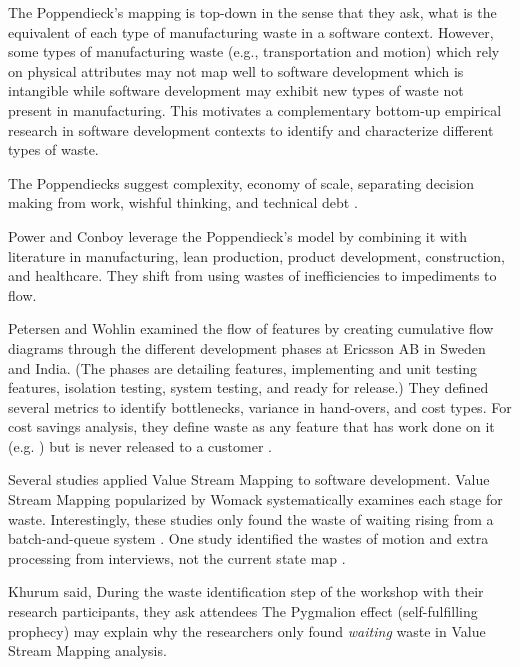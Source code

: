 The Poppendieck's mapping is top-down in the sense that they ask, what is the equivalent of each type of manufacturing waste in a software context. However, some types of manufacturing waste (e.g., transportation and motion) which rely on physical attributes may not map well to software development which is intangible while software development may exhibit new types of waste not present in manufacturing. This motivates a complementary bottom-up empirical research in software development contexts to identify and characterize different types of waste. 


The Poppendiecks suggest  complexity, economy of scale, separating decision making from work, wishful thinking, and technical debt \cite{PoppendieckResultsNotPoint}.


Power and Conboy leverage the Poppendieck's model by combining it with literature in manufacturing, lean production, product development, construction, and healthcare. They shift from using wastes of inefficiencies to impediments to flow. \cite{PowerImpediments}


Petersen and Wohlin examined the flow of features by creating cumulative flow diagrams through the different development phases at Ericsson AB in Sweden and India. (The phases are detailing features, implementing and unit testing features, isolation testing, system testing, and ready for release.) They defined several metrics to identify bottlenecks, variance in hand-overs, and cost types. For cost savings analysis, they define waste as any feature that has work done on it (e.g. ) but is never released to a customer \cite{Petersen2011}.


Several studies applied Value Stream Mapping to software development. Value Stream Mapping popularized by Womack systematically examines each stage for waste. Interestingly, these studies only found the waste of waiting rising from a batch-and-queue system \cite{Ali2016, Khurum2014, Mujtaba2010}. One study identified the wastes of motion and extra processing from interviews, not the current state map \cite{Mujtaba2010}.


Khurum said,  During the waste identification step of the workshop with their research participants, they ask attendees  \cite{Khurum2014} The Pygmalion effect (self-fulfilling prophecy) may explain why the researchers only found \textit{waiting} waste in Value Stream Mapping analysis.



